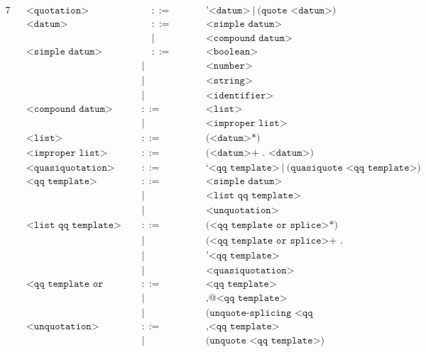 \documentclass{article}
\begin{document}
\newpage
\begin{alignat*}{7}
&& \texttt{<quotation>}  && \quad ::= &\quad && \texttt{'<datum>}\ | \ \texttt{(quote <datum>)}\\[1mm]
&& \texttt{<datum>}  && \quad ::=  &\quad && \texttt{<simple datum>}\\[1mm]
&&                      && \quad | &\quad && \texttt{<compound datum>}\\[1mm]
&& \texttt{<simple datum>}  && \quad ::=  &\quad && \texttt{<boolean>}\\[1mm]
&&                      && | &\quad && \texttt{<number>}\\[1mm]
&&                      && | &\quad && \texttt{<string>}\\[1mm]
&&                      && | &\quad && \texttt{<identifier>}\\[1mm]
&& \texttt{<compound datum>}  && ::=  &\quad && \texttt{<list>}\\[1mm]
&&                      && | &\quad && \texttt{<improper list>}\\[1mm]
&& \texttt{<list>} && ::= &\quad && \texttt{(<datum>*)}\\[1mm]
&& \texttt{<improper list>} && ::= &\quad && \texttt{(<datum>+ . <datum>)}\\[1mm]
&& \texttt{<quasiquotation>}  && ::= &\quad && \texttt{`<qq template>}\ | \ \texttt{(quasiquote <qq template>)}\\[1mm]
&& \texttt{<qq template>} && ::= &\quad && \texttt{<simple datum>}\\[1mm]
&&                      && | &\quad && \texttt{<list qq template>}\\[1mm]
&&                      && | &\quad && \texttt{<unquotation>}\\[1mm]
&& \texttt{<list qq template>} && ::= &\quad && \texttt{(<qq template or splice>*)}\\[1mm]
&&                      && | &\quad && \texttt{(<qq template or splice>+ . <qq template>)}\\[1mm]
&&                      && | &\quad && \texttt{'<qq template>}\\[1mm]
&&                      && | &\quad && \texttt{<quasiquotation>}\\[1mm]
&& \texttt{<qq template or splice>} && ::= &\quad && \texttt{<qq template>}\\[1mm]
&&                      && | &\quad && \texttt{,@<qq template>}\\[1mm]
&&                      && | &\quad && \texttt{(unquote-splicing <qq template>)}\\[1mm]
&& \texttt{<unquotation>} && ::= &\quad && \texttt{,<qq template>}\\[1mm]
&&                      && | &\quad && \texttt{(unquote <qq template>)}\\[1mm]
\end{alignat*}
\end{document}
